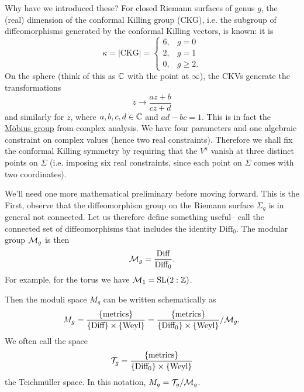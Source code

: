 Why have we introduced these? For closed Riemann surfaces of genus $g$, the (real) dimension of the conformal Killing group (CKG), i.e. the subgroup of diffeomorphisms generated by the conformal Killing vectors, is known: it is
\begin{equation}
    \kappa =|\text{CKG}|=\begin{cases}
        6, & g=0\\
        2, & g=1\\
        0, & g \geq 2.
    \end{cases}
\end{equation}
On the sphere (think of this as $\mathbb{C}$ with the point at $\infty$), the CKVs generate the transformations
\begin{equation}
    z \to \frac{az+b}{cz+d}
\end{equation}
and similarly for $\bar z$, where $a,b,c,d\in \mathbb{C}$ and $ad-bc=1$. This is in fact the \href{https://en.wikipedia.org/wiki/M\%C3\%B6bius_transformation}{M\"obius group} from complex analysis. We have four parameters and one algebraic constraint on complex values (hence two real constraints). Therefore we shall fix the conformal Killing symmetry by requiring that the $V^a$ vanish at three distinct points on $\Sigma$ (i.e. imposing six real constraints, since each point on $\Sigma$ comes with two coordinates).

We'll need one more mathematical preliminary before moving forward. This is the  First, observe that the diffeomorphism group on the Riemann surface $\Sigma_g$ is in general not connected. Let us therefore define something useful-- call the connected set of diffeomorphisms that includes the identity $\text{Diff}_0$. The modular group $\mathcal{M}_g$ is then
\begin{equation}
    \mathcal{M}_g =\frac{\text{Diff}}{\text{Diff}_0}.
\end{equation}
For example, for the torus we have $\mathcal{M}_1=\text{SL}(2:\mathbb{Z})$.

Then the moduli space $M_g$ can be written schematically as
\begin{equation}
    M_g = \frac{\{\text{metrics}\}}{\{\text{Diff}\}\times \{\text{Weyl}\}}=\frac{\{\text{metrics}\}}{\{\text{Diff}_0\}\times \{\text{Weyl}\}}/\mathcal{M}_g.
\end{equation}
We often call the space
\begin{equation}
    \mathcal{T}_g= \frac{\{\text{metrics}\}}{\{\text{Diff}_0\}\times \{\text{Weyl}\}}
\end{equation}
the Teichm\"uller space. In this notation, $M_g= \mathcal{T}_g/\mathcal{M}_g$.

